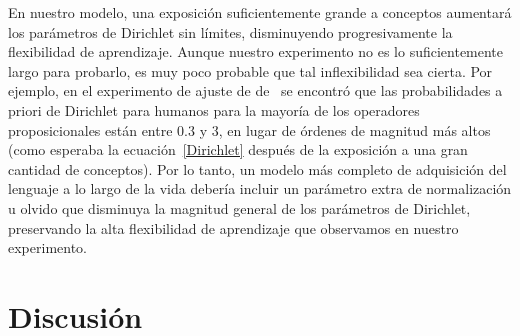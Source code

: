 En nuestro modelo, una exposición suficientemente grande a conceptos aumentará los parámetros de Dirichlet sin límites, disminuyendo progresivamente la flexibilidad de aprendizaje. Aunque nuestro experimento no es lo suficientemente largo para probarlo, es muy poco probable que tal inflexibilidad sea cierta. Por ejemplo, en el experimento de ajuste de \lot de~\cite{piantadosi2016logical} se encontró que las probabilidades a priori de Dirichlet para humanos para la mayoría de los operadores proposicionales están entre $0.3$ y $3$, en lugar de órdenes de magnitud más altos (como esperaba la ecuación~\eqref{Dirichlet} después de la exposición a una gran cantidad de conceptos). Por lo tanto, un modelo más completo de adquisición del lenguaje a lo largo de la vida debería incluir un parámetro extra de normalización u olvido que disminuya la magnitud general de los parámetros de Dirichlet, preservando la alta flexibilidad de aprendizaje que observamos en nuestro experimento.

\section{Discusión}

